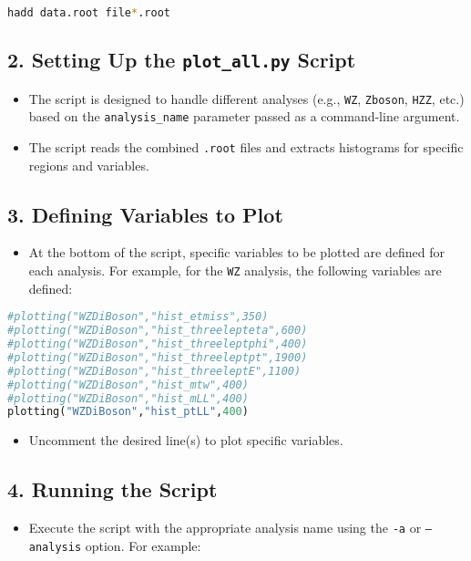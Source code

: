 \documentclass{article}
\begin{document}
\begin{lstlisting}[language=bash]
hadd data.root file*.root
\end{lstlisting}

\subsection*{2. Setting Up the \texttt{plot\_all.py} Script}
\begin{itemize}
    \item The script is designed to handle different analyses (e.g., \texttt{WZ}, \texttt{Zboson}, \texttt{HZZ}, etc.) based on the \texttt{analysis\_name} parameter passed as a command-line argument.
    \item The script reads the combined \texttt{.root} files and extracts histograms for specific regions and variables.
\end{itemize}

\subsection*{3. Defining Variables to Plot}
\begin{itemize}
    \item At the bottom of the script, specific variables to be plotted are defined for each analysis. For example, for the \texttt{WZ} analysis, the following variables are defined:
\end{itemize}

\begin{lstlisting}[language=python]
#plotting("WZDiBoson","hist_etmiss",350)
#plotting("WZDiBoson","hist_threelepteta",600)
#plotting("WZDiBoson","hist_threeleptphi",400)
#plotting("WZDiBoson","hist_threeleptpt",1900)
#plotting("WZDiBoson","hist_threeleptE",1100)
#plotting("WZDiBoson","hist_mtw",400)
#plotting("WZDiBoson","hist_mLL",400)
plotting("WZDiBoson","hist_ptLL",400)
\end{lstlisting}

\begin{itemize}
    \item Uncomment the desired line(s) to plot specific variables.
\end{itemize}

\subsection*{4. Running the Script}
\begin{itemize}
    \item Execute the script with the appropriate analysis name using the \texttt{-a} or \texttt{--analysis} option. For example:
\end{itemize}
\end{document}
